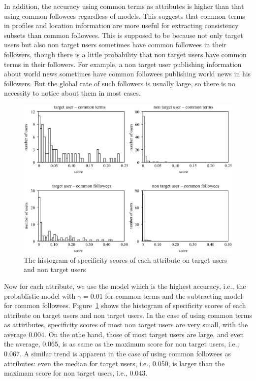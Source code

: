 In addition, the accuracy using common terms as attributes is higher
than that using common followees regardless of models.  This suggests
that common terms in profiles and location information are more useful for
extracting consistency subsets than common followees.  This is supposed
to be because not only target users but also non target users sometimes
have common followees in their followers, though there is a little
probability that non target users have common terms in their followers.
For example, a non target user publishing information about world news
sometimes have common followees publishing world news in
his followers.  But the global rate of such followers is usually
large, so there is no necessity to notice about them in most
cases.

{\footnotesize
\begin{figure}[t]
\begin{center}
\includegraphics[width=14cm]{images/histogram.eps}
 \caption{The histogram of specificity scores of each attribute on
 target users and non target users}
\label{fig:histogram}
\end{center}
\end{figure}
}

Now for each attribute, we use the model which is the highest accuracy,
i.e., the probablistic model with $\gamma=0.01$ for common terms and the
subtracting model for common
followees. Figure~\ref{fig:histogram} shows the histogram of specificity
scores of each attribute on target users and non target users.  In the
case of using common terms as attiributes, specificity scores of most
non target users are very small, with the average 0.004.  On the othe
hand, those of most target users are large, and even the average, 0.065,
is as same as the maximum score for non target users, i.e., 0.067.  A
similar trend is apparent in the case of using common followees as
attributes: even the median for target users, i.e., 0.050, is larger
than the maximam score for non target users, i.e., 0.043.

